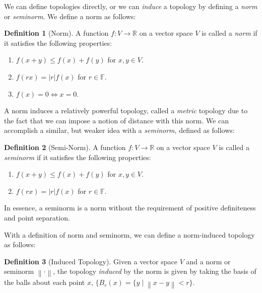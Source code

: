 \documentclass{article}
\theoremstyle{plain}
\theoremstyle{definition}
\newtheorem{definition}{Definition}
\newcommand{\abs}[1]{\left\lvert #1 \right\rvert}
\newcommand{\norm}[1]{\left\lVert #1 \right\rVert}
\newcommand{\bb}[1]{\mathbb{#1}}
\begin{document}
                We can define topologies directly, or we can \textit{induce} a topology by defining a \textit{norm} or \textit{seminorm}.
                We define a norm as follows:
                \begin{definition}[Norm] \label{def:norm}
                        A function $f : V \to \bb{R}$ on a vector space $V$ is called a \textit{norm} if it satisfies the following properties:
                        \begin{enumerate}
                        \item $f(x + y) \leq f(x) + f(y)$ for $x, y \in V$.
                        \item $f(rx) = \abs{r}f(x)$ for $r \in \bb{F}$.
                        \item $f(x) = 0 \iff x = 0$.
                        \end{enumerate}
                \end{definition}
                A norm induces a relatively powerful topology, called a \textit{metric} topology due to the fact that we can impose a notion of distance with this norm.
                We can accomplish a similar, but weaker idea with a \textit{seminorm}, defined as follows:
                \begin{definition}[Semi-Norm] \label{def:seminorm}
                        A function $f : V \to \bb{R}$ on a vector space $V$ is called a \textit{seminorm} if it satisfies the following properties:
                        \begin{enumerate}
                        \item $f(x + y) \leq f(x) + f(y)$ for $x, y \in V$.
                        \item $f(rx) = \abs{r}f(x)$ for $r \in \bb{F}$.
                        \end{enumerate}
                        
                        In essence, a seminorm is a norm without the requirement of positive definiteness and point separation.
                \end{definition}

                With a definition of norm and seminorm, we can define a norm-induced topology as follows:
                \begin{definition}[Induced Topology] \label{def:induced topology}
                        Given a vector space $V$ and a norm or seminorm $\norm{\cdot}$, the topology \textit{induced} by the norm is given by taking the basis of the balls about each point $x$, $\{B_r(x) = \{y \mid \norm{x - y} < r\}$.
                \end{definition}
                
\end{document}
